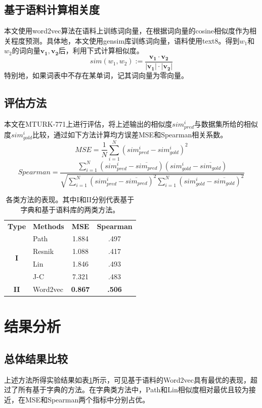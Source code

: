 \documentclass{article}
\begin{document}
\subsection{基于语料计算相关度}
本文使用word2vec算法在语料上训练词向量，在根据词向量的cosine相似度作为相关程度预测。具体地，本文使用gensim库训练词向量，语料使用text8。得到$w_1$和$w_2$的词向量$\mathbf{v_1}, \mathbf{v_2}$后，利用下式计算相似度。
\[ sim(w_1, w_2) := \frac{\mathbf{v_1}\cdot \mathbf{v_2}}{|\mathbf{v_1}|\cdot |\mathbf{v_2}|} \]
特别地，如果词表中不存在某单词，记其词向量为零向量。

\subsection{评估方法}
本文在MTURK-771上进行评估，将上述输出的相似度$sim_{pred}^i$与数据集所给的相似度$sim_{gold}^i$比较，通过如下方法计算均方误差MSE和Spearman相关系数。
\[ MSE = \frac{1}{N} \sum\limits_{i=1}^{N} {(sim_{pred}^i-sim_{gold}^i)}^2 \]
\[ Spearman = \frac{\sum\limits_{i=1}^N (sim_{pred}^i - \overline{sim_{pred}})(sim_{gold}^i - \overline{sim_{gold}})}{\sqrt{\sum\limits_{i=1}^N {(sim_{pred}^i - \overline{sim_{pred}})}^2  \sum\limits_{i=1}^N {(sim_{gold}^i - \overline{sim_{gold}})}^2}} \]


\begin{table}[h]
  \centering
  \begin{tabular}{c l c c}
    \toprule
    \bfseries Type & \bfseries Methods & \bfseries MSE & \bfseries Spearman\\
    \cmidrule(lr){1-4}
    \multirow{4}{*}{\bfseries I} &
    Path  & 1.884 & .497 \\
    & Resnik & 1.088 & .417 \\
    & Lin & 1.846 & .493 \\
    & J-C & 7.321 & .483 \\
    \cmidrule(lr){1-4}
    \multirow{1}{*}{\bfseries II} &
    Word2vec & \bfseries 0.867 & \bfseries .506 \\
    \bottomrule
\end{tabular}
  \caption{各类方法的表现。其中I和II分别代表基于字典和基于语料库的两类方法。}
  \label{tab:overall_eval}
\end{table}

\section{结果分析}
\subsection{总体结果比较}
上述方法所得实验结果如表\ref{tab:overall_eval}所示，可见基于语料的Word2vec具有最优的表现，超过了所有基于字典的方法。在字典类方法中，Path和Lin相似度相对最优且较为接近，在MSE和Spearman两个指标中分别占优。
\end{document}
